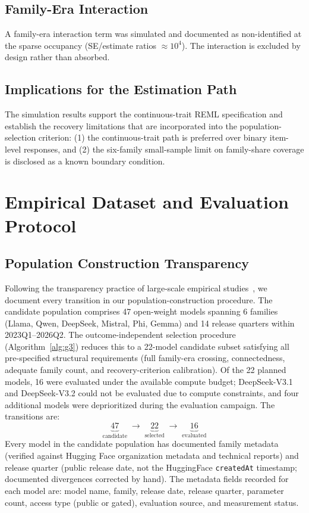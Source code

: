 \documentclass{ieeeaccess}
\theoremstyle{definition}
\theoremstyle{plain}
\begin{document}
\subsection{Family-Era Interaction}
A family-era interaction term was simulated and documented as non-identified at the sparse occupancy (SE/estimate ratios $\approx 10^4$). The interaction is excluded by design rather than absorbed.

\subsection{Implications for the Estimation Path}
The simulation results support the continuous-trait REML specification and establish the recovery limitations that are incorporated into the population-selection criterion: (1) the continuous-trait path is preferred over binary item-level responses, and (2) the six-family small-sample limit on family-share coverage is disclosed as a known boundary condition.

\section{Empirical Dataset and Evaluation Protocol}
\label{sec:empirical}

\subsection{Population Construction Transparency}
Following the transparency practice of large-scale empirical studies~\cite{kim2025}, we document every transition in our population-construction procedure. The candidate population comprises 47 open-weight models spanning 6 families (Llama, Qwen, DeepSeek, Mistral, Phi, Gemma) and 14 release quarters within 2023Q1--2026Q2. The outcome-independent selection procedure (Algorithm~\ref{alg:g3}) reduces this to a 22-model candidate subset satisfying all pre-specified structural requirements (full family-era crossing, connectedness, adequate family count, and recovery-criterion calibration). Of the 22 planned models, 16 were evaluated under the available compute budget; DeepSeek-V3.1 and DeepSeek-V3.2 could not be evaluated due to compute constraints, and four additional models were deprioritized during the evaluation campaign. The transitions are:
\[
\underbrace{47}_{\text{candidate}} \;\longrightarrow\; \underbrace{22}_{\text{selected}} \;\longrightarrow\; \underbrace{16}_{\text{evaluated}}
\]
Every model in the candidate population has documented family metadata (verified against Hugging Face organization metadata and technical reports) and release quarter (public release date, not the HuggingFace \texttt{createdAt} timestamp; documented divergences corrected by hand). The metadata fields recorded for each model are: model name, family, release date, release quarter, parameter count, access type (public or gated), evaluation source, and measurement status.
\end{document}
